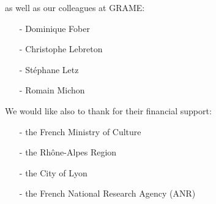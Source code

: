 as well as our colleagues at GRAME:
\begin{itemize}
\setlength\itemsep{0em}
\item[-]Dominique Fober
\item[-]Christophe Lebreton
\item[-]St\'ephane Letz
\item[-]Romain Michon
\end{itemize}

We would like also to thank for their financial support:
\begin{itemize}
\setlength\itemsep{0em}
\item[-]the French Ministry of Culture
\item[-]the Rh\^one-Alpes Region
\item[-]the City of Lyon
\item[-]the French National Research Agency (\textsc{ANR})
\end{itemize}


